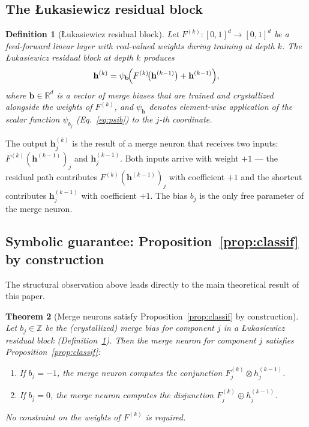 \documentclass[lettersize,journal]{IEEEtran}
\newtheorem{theorem}{Theorem}
\newtheorem{definition}[theorem]{Definition}
\newcommand{\tnorm}{\otimes}      %
\newcommand{\disj}{\oplus}        %
\begin{document}
\subsection{The \L{}ukasiewicz residual block}
\label{ssec:res_block}

\begin{definition}[\L{}ukasiewicz residual block]
\label{def:resblock}
Let $F^{(k)}\colon [0,1]^d \to [0,1]^d$ be a feed-forward linear layer
with real-valued weights during training at depth $k$.
The \emph{\L{}ukasiewicz residual block} at depth $k$ produces
\begin{equation}
  \mathbf{h}^{(k)} = \psi_{\mathbf{b}}\!\Bigl(
    F^{(k)}\!\bigl(\mathbf{h}^{(k-1)}\bigr)
    + \mathbf{h}^{(k-1)}
  \Bigr),
  \label{eq:resblock}
\end{equation}
where $\mathbf{b} \in \mathbb{R}^d$ is a vector of \emph{merge biases} that
are trained and crystallized alongside the weights of $F^{(k)}$, and
$\psi_{\mathbf{b}}$ denotes element-wise application of the scalar function
$\psi_{b_j}$ (Eq.~\eqref{eq:psib}) to the $j$-th coordinate.
\end{definition}

The output $\mathbf{h}^{(k)}_j$ is the result of a merge neuron that receives
two inputs: $F^{(k)}(\mathbf{h}^{(k-1)})_j$ and $\mathbf{h}^{(k-1)}_j$.
Both inputs arrive with weight $+1$ --- the residual path contributes
$F^{(k)}(\mathbf{h}^{(k-1)})_j$ with coefficient $+1$ and the shortcut
contributes $\mathbf{h}^{(k-1)}_j$ with coefficient $+1$.
The bias $b_j$ is the only free parameter of the merge neuron.

\subsection{Symbolic guarantee: Proposition~\ref{prop:classif} by construction}
\label{ssec:res_theorem}

The structural observation above leads directly to the main theoretical result
of this paper.

\begin{theorem}[Merge neurons satisfy Proposition~\ref{prop:classif} by construction]
\label{thm:merge}
Let $b_j \in \mathbb{Z}$ be the (crystallized) merge bias for component $j$
in a \L{}ukasiewicz residual block (Definition~\ref{def:resblock}).
Then the merge neuron for component $j$ satisfies Proposition~\ref{prop:classif}:
\begin{enumerate}
  \item If $b_j = -1$, the merge neuron computes the conjunction
        $F^{(k)}_j \tnorm h^{(k-1)}_j$.
  \item If $b_j = 0$, the merge neuron computes the disjunction
        $F^{(k)}_j \disj h^{(k-1)}_j$.
\end{enumerate}
No constraint on the weights of $F^{(k)}$ is required.
\end{theorem}
\end{document}
